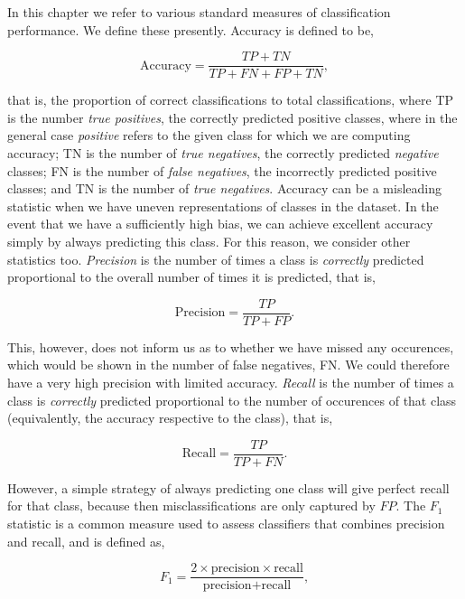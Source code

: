 In this chapter we refer to various standard measures of classification performance. We define these presently. Accuracy is defined to be,

\begin{equation}
\text{Accuracy} = \frac{TP + TN}{TP + FN + FP + TN},
\label{eq:accuracy}
\end{equation}

that is, the proportion of correct classifications to total classifications, where TP is the number \emph{true positives}, the correctly predicted positive classes, where in the general case \emph{positive} refers to the given class for which we are computing accuracy; TN is the number of \emph{true negatives}, the correctly predicted \emph{negative} classes; FN is the number of \emph{false negatives}, the incorrectly predicted positive classes; and TN is the number of \emph{true negatives}. Accuracy can be a misleading statistic when we have uneven representations of classes in the dataset. In the event that we have a sufficiently high bias, we can achieve excellent accuracy simply by always predicting this class. For this reason, we consider other statistics too. \emph{Precision} is the number of times a class is \emph{correctly} predicted proportional to the overall number of times it is predicted, that is,

\begin{equation}
\text{Precision} = \frac{TP}{TP + FP}.
\label{eq:precision}
\end{equation}

This, however, does not inform us as to whether we have missed any occurences, which would be shown in the number of false negatives, FN. We could therefore have a very high precision with limited accuracy. \emph{Recall} is the number of times a class is \emph{correctly} predicted proportional to the number of occurences of that class (equivalently, the accuracy respective to the class), that is,

\begin{equation}
\text{Recall} = \frac{TP}{TP + FN}.
\label{eq:recall}
\end{equation}

However, a simple strategy of always predicting one class will give perfect recall for that class, because then misclassifications are only captured by $FP$. The $F_1$ statistic is a common measure used to assess classifiers that combines precision and recall, and is defined as,

\begin{equation}
F_1 = \frac{2 \times \text{precision} \times \text{recall}}{\text{precision} + \text{recall}},
\label{eq:f1}
\end{equation}

